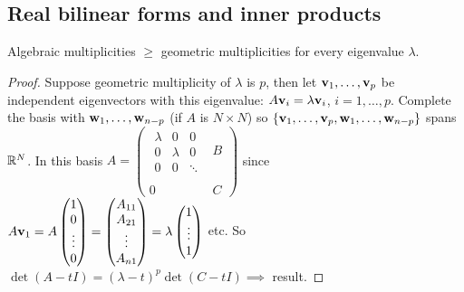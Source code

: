 \documentclass[10pt, a4paper]{article}
\begin{document}
\subsection{Real bilinear forms and inner products}

\begin{proposition}
    Algebraic multiplicities $\geq$ geometric multiplicities for every eigenvalue $\lambda$.

    \begin{proof}
        Suppose geometric multiplicity of $\lambda$ is $p$,
        then let $\mathbf{v}_1, \dotsc, \mathbf{v}_p$ be independent eigenvectors with this eigenvalue:
        $A\mathbf{v}_i = \lambda\mathbf{v}_i$,
        $i = 1, \dotsc, p$.
        Complete the basis with $\mathbf{w}_1, \dotsc, \mathbf{w}_{n - p}$
        (if $A$ is $N \times N$)
        so $\{\mathbf{v}_1, \dotsc, \mathbf{v}_p, \mathbf{w}_1, \dotsc, \mathbf{w}_{n - p}\}$ spans $\mathbb{R} ^ N$.
        In this basis 
        $A = \left(\begin{array}{c|c}
             \begin{matrix}
                 \lambda & 0 & 0 \\
                 0 & \lambda & 0 \\
                 0 & 0 & \ddots
             \end{matrix} & B  \\
              & \\
             \hline
             0 & C
        \end{array}\right)$
        since $A\mathbf{v}_1 = A\begin{pmatrix}
            1 \\ 0 \\ \vdots \\ 0
        \end{pmatrix} = \begin{pmatrix}
            A_{11} \\ A_{21} \\ \vdots \\ A_{n1}
        \end{pmatrix} = \lambda\begin{pmatrix}
            1 \\ \vdots \\ 1
        \end{pmatrix}$ etc.
        So $\det(A - tI) = (\lambda - t) ^ p\det(C - tI) \implies$ result.
    \end{proof}
\end{proposition}
\end{document}
